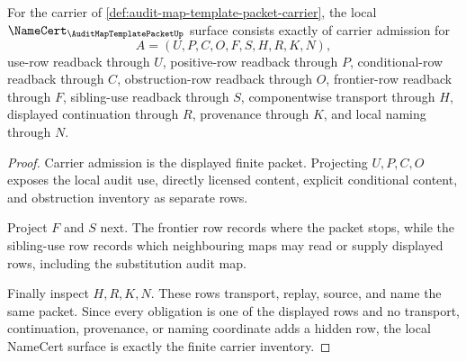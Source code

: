 \begin{theorem}
\label{thm:audit-map-template-packet-namecert-obligations}
For the carrier of \autoref{def:audit-map-template-packet-carrier}, the local $\NameCert_{\AuditMapTemplatePacketUp}$ surface consists exactly of carrier admission for
$$
A=(U,P,C,O,F,S,H,R,K,N),
$$
use-row readback through $U$, positive-row readback through $P$, conditional-row readback through $C$, obstruction-row readback through $O$, frontier-row readback through $F$, sibling-use readback through $S$, componentwise transport through $H$, displayed continuation through $R$, provenance through $K$, and local naming through $N$.
\end{theorem}
\begin{proof}
Carrier admission is the displayed finite packet. Projecting $U,P,C,O$ exposes the local audit use, directly licensed content, explicit conditional content, and obstruction inventory as separate rows.

Project $F$ and $S$ next. The frontier row records where the packet stops, while the sibling-use row records which neighbouring maps may read or supply displayed rows, including the substitution audit map.

Finally inspect $H,R,K,N$. These rows transport, replay, source, and name the same packet. Since every obligation is one of the displayed rows and no transport, continuation, provenance, or naming coordinate adds a hidden row, the local NameCert surface is exactly the finite carrier inventory.
\end{proof}

